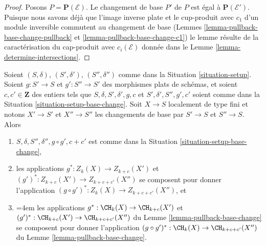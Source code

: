 \begin{proof}
Posons $P = \mathbf{P}(\mathcal{E})$. Le changement de base $P'$ de $P$
est égal à $\mathbf{P}(\mathcal{E}')$. Puisque nous savons déjà que
l'image inverse plate et le cup-produit avec $c_1$ d'un module inversible
commutent au changement de base (Lemmes \ref{lemma-pullback-base-change-pullback} et
\ref{lemma-pullback-base-change-c1})
le lemme résulte de la caractérisation du cap-produit
avec $c_i(\mathcal{E})$ donnée dans le Lemme \ref{lemma-determine-intersections}.
\end{proof}

\begin{lemma}
\label{lemma-compose-base-change}
Soient $(S, \delta)$, $(S', \delta')$, $(S'', \delta'')$ comme dans la
Situation \ref{situation-setup}. Soient $g : S' \to S$ et $g' : S'' \to S'$
des morphismes plats de schémas, et soient $c, c' \in \mathbf{Z}$
des entiers tels que $S, \delta, S', \delta', g, c$ et
$S', \delta', S'', g', c'$ soient comme dans la
Situation \ref{situation-setup-base-change}.
Soit $X \to S$ localement de type fini et notons $X' \to S'$
et $X'' \to S''$ les changements de base par $S' \to S$ et $S'' \to S$.
Alors
\begin{enumerate}
\item $S, \delta, S'', \delta'', g \circ g', c + c'$ est comme dans la
Situation \ref{situation-setup-base-change},
\item les applications $g^* : Z_k(X) \to Z_{k + c}(X')$ et
$(g')^* : Z_{k + c}(X') \to Z_{k + c + c'}(X'')$ se
composent pour donner l'application $(g \circ g')^* : Z_k(X) \to Z_{k + c + c'}(X'')$, et
\item {\emergencystretch=4em les applications $g^* : \CH_k(X) \to \CH_{k + c}(X')$ et
$(g')^* : \CH_{k + c}(X') \to \CH_{k + c + c'}(X'')$ du
Lemme \ref{lemma-pullback-base-change}
se composent pour donner l'application $(g \circ g')^* : \CH_k(X) \to \CH_{k + c + c'}(X'')$
du Lemme \ref{lemma-pullback-base-change}.\par}
\end{enumerate}
\end{lemma}

